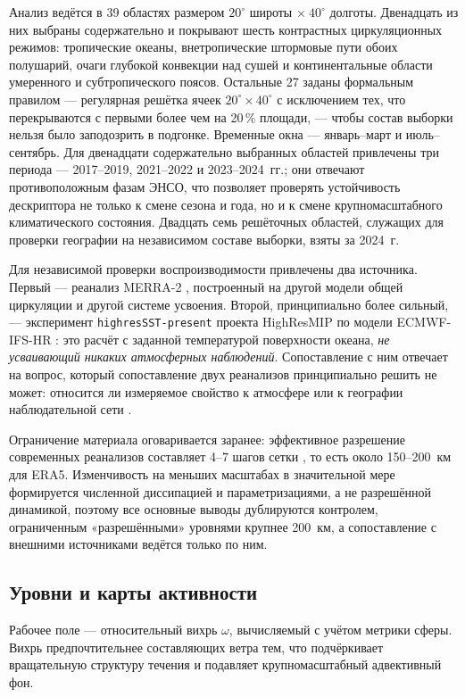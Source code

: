 \documentclass[11pt,a4paper]{article}
\begin{document}
Анализ ведётся в 39 областях размером $20^\circ$ широты $\times\ 40^\circ$ долготы. Двенадцать из них выбраны содержательно и покрывают шесть контрастных циркуляционных режимов: тропические океаны, внетропические штормовые пути обоих полушарий, очаги глубокой конвекции над сушей и континентальные области умеренного и субтропического поясов. Остальные 27 заданы формальным правилом --- регулярная решётка ячеек $20^\circ\times40^\circ$ с исключением тех, что перекрываются с первыми более чем на 20\,\% площади, --- чтобы состав выборки нельзя было заподозрить в подгонке. Временные окна --- январь--март и июль--сентябрь. Для двенадцати содержательно выбранных областей привлечены три периода --- 2017--2019, 2021--2022 и 2023--2024~гг.; они отвечают противоположным фазам ЭНСО, что позволяет проверять устойчивость дескриптора не только к смене сезона и года, но и к смене крупномасштабного климатического состояния. Двадцать семь решёточных областей, служащих для проверки географии на независимом составе выборки, взяты за 2024~г.

Для независимой проверки воспроизводимости привлечены два источника. Первый --- реанализ MERRA-2 \cite{Gelaro2017}, построенный на другой модели общей циркуляции и другой системе усвоения. Второй, принципиально более сильный, --- эксперимент \texttt{highresSST-present} проекта HighResMIP \cite{Haarsma2016} по модели ECMWF-IFS-HR \cite{Roberts2018}: это расчёт с заданной температурой поверхности океана, \emph{не усваивающий никаких атмосферных наблюдений}. Сопоставление с ним отвечает на вопрос, который сопоставление двух реанализов принципиально решить не может: относится ли измеряемое свойство к атмосфере или к географии наблюдательной сети \cite{BonavitaLaloyaux2020}.

Ограничение материала оговаривается заранее: эффективное разрешение современных реанализов составляет 4--7 шагов сетки \cite{Skamarock2004,Bolgiani2022}, то есть около 150--200~км для ERA5. Изменчивость на меньших масштабах в значительной мере формируется численной диссипацией и параметризациями, а не разрешённой динамикой, поэтому все основные выводы дублируются контролем, ограниченным «разрешёнными» уровнями крупнее 200~км, а сопоставление с внешними источниками ведётся только по ним.

\subsection{Уровни и карты активности}

Рабочее поле --- относительный вихрь $\omega$, вычисляемый с учётом метрики сферы. Вихрь предпочтительнее составляющих ветра тем, что подчёркивает вращательную структуру течения и подавляет крупномасштабный адвективный фон.
\end{document}
